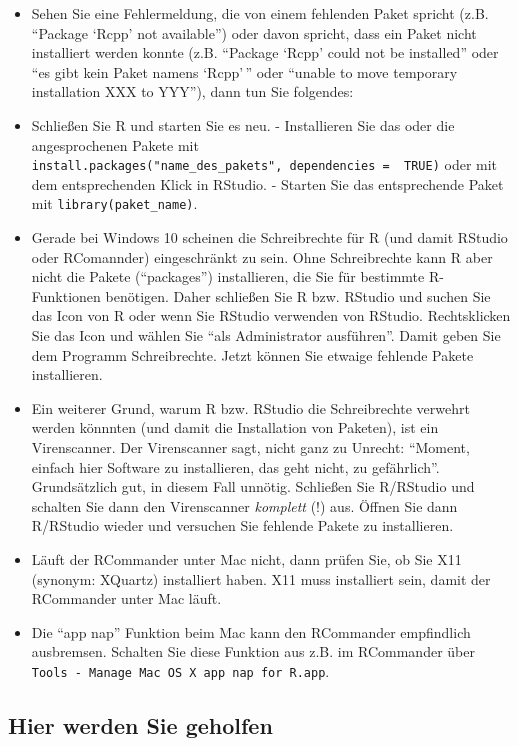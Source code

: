 \documentclass[12pt,]{book}
\begin{document}
\begin{itemize}
\item
  Sehen Sie eine Fehlermeldung, die von einem fehlenden Paket spricht
  (z.B. ``Package `Rcpp' not available'') oder davon spricht, dass ein
  Paket nicht installiert werden konnte (z.B. ``Package `Rcpp' could not
  be installed'' oder ``es gibt kein Paket namens `Rcpp'\,'' oder
  ``unable to move temporary installation XXX to YYY''), dann tun Sie
  folgendes:
\item
  Schließen Sie R und starten Sie es neu. - Installieren Sie das oder
  die angesprochenen Pakete mit
  \texttt{install.packages("name\_des\_pakets",\ dependencies\ =\ \ TRUE)}
  oder mit dem entsprechenden Klick in RStudio. - Starten Sie das
  entsprechende Paket mit \texttt{library(paket\_name)}.
\item
  Gerade bei Windows 10 scheinen die Schreibrechte für R (und damit
  RStudio oder RComannder) eingeschränkt zu sein. Ohne Schreibrechte
  kann R aber nicht die Pakete (``packages'') installieren, die Sie für
  bestimmte R-Funktionen benötigen. Daher schließen Sie R bzw. RStudio
  und suchen Sie das Icon von R oder wenn Sie RStudio verwenden von
  RStudio. Rechtsklicken Sie das Icon und wählen Sie ``als Administrator
  ausführen''. Damit geben Sie dem Programm Schreibrechte. Jetzt können
  Sie etwaige fehlende Pakete installieren.
\item
  Ein weiterer Grund, warum R bzw. RStudio die Schreibrechte verwehrt
  werden könnnten (und damit die Installation von Paketen), ist ein
  Virenscanner. Der Virenscanner sagt, nicht ganz zu Unrecht: ``Moment,
  einfach hier Software zu installieren, das geht nicht, zu
  gefährlich''. Grundsätzlich gut, in diesem Fall unnötig. Schließen Sie
  R/RStudio und schalten Sie dann den Virenscanner \emph{komplett} (!)
  aus. Öffnen Sie dann R/RStudio wieder und versuchen Sie fehlende
  Pakete zu installieren.
\item
  Läuft der RCommander unter Mac nicht, dann prüfen Sie, ob Sie X11
  (synonym: XQuartz) installiert haben. X11 muss installiert sein, damit
  der RCommander unter Mac läuft.
\item
  Die ``app nap'' Funktion beim Mac kann den RCommander empfindlich
  ausbremsen. Schalten Sie diese Funktion aus z.B. im RCommander über
  \texttt{Tools\ -\ Manage\ Mac\ OS\ X\ app\ nap\ for\ R.app}.
\end{itemize}

\subsection{Hier werden Sie geholfen}\label{hier-werden-sie-geholfen}
\end{document}
